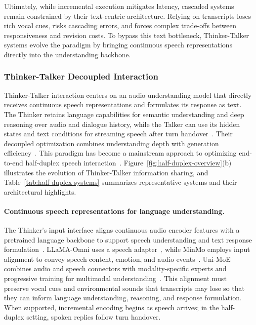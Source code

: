 Ultimately, while incremental execution mitigates latency, cascaded systems remain constrained by their text-centric architecture. Relying on transcripts loses rich vocal cues, risks cascading errors, and forces complex trade-offs between responsiveness and revision costs. To bypass this text bottleneck, Thinker-Talker systems evolve the paradigm by bringing continuous speech representations directly into the understanding backbone.

\subsubsection{Thinker-Talker Decoupled Interaction}
\label{sec:thinker-talker-decoupled-interaction}
Thinker-Talker interaction centers on an audio understanding model that directly receives continuous speech representations and formulates its response as text. The Thinker retains language capabilities for semantic understanding and deep reasoning over audio and dialogue history, while the Talker can use its hidden states and text conditions for streaming speech after turn handover~\citep{DBLP:journals/corr/abs-2501-06282,DBLP:journals/corr/abs-2503-20215,DBLP:journals/corr/abs-2509-17765}. Their decoupled optimization combines understanding depth with generation efficiency~\citep{DBLP:conf/icml/WangLFZS000M25}. This paradigm has become a mainstream approach to optimizing end-to-end half-duplex speech interaction~\citep{DBLP:conf/iclr/FangGZMZ025,DBLP:journals/corr/abs-2501-06282,DBLP:journals/corr/abs-2503-20215,DBLP:journals/corr/abs-2509-17765}. Figure~\ref{fig:half-duplex-overview}(b) illustrates the evolution
of Thinker-Talker information sharing, and
Table~\ref{tab:half-duplex-systems} summarizes representative
systems and their architectural highlights.

\paragraph{Continuous speech representations for language understanding.}
The Thinker's input interface aligns continuous audio encoder features
with a pretrained language backbone to support speech understanding
and text response formulation~\citep{DBLP:conf/iclr/FangGZMZ025,DBLP:journals/corr/abs-2501-06282,DBLP:journals/corr/abs-2503-20215}.
LLaMA-Omni uses a speech adapter~\citep{DBLP:conf/iclr/FangGZMZ025},
while MinMo employs input alignment to convey speech content,
emotion, and audio events~\citep{DBLP:journals/corr/abs-2501-06282}.
Uni-MoE combines audio and speech connectors with modality-specific
experts and progressive training for multimodal
understanding~\citep{DBLP:journals/pami/LiJHWZLMZ25}.
This alignment must preserve vocal cues and environmental sounds
that transcripts may lose so that they can inform language understanding,
reasoning, and response formulation.
When supported, incremental encoding begins as speech arrives;
in the half-duplex setting, spoken replies follow turn handover.

